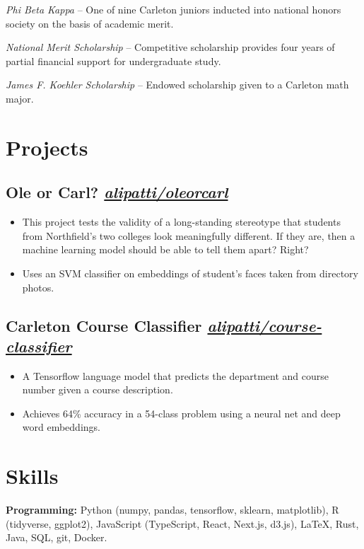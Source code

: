 \documentclass{ali-resume}
\begin{document}
\textit{Phi Beta Kappa} -- One of nine Carleton juniors inducted into national honors society on the basis of academic merit.

\textit{National Merit Scholarship} -- Competitive scholarship provides four years of partial financial support for undergraduate study.

\textit{James F. Koehler Scholarship} -- Endowed scholarship given to a Carleton math major.

\section{Projects}

\newcommand{\project}[2]{%
	\subsection{#1
		\hfill
		\normalfont \small \faicon{github}
		\href{http://github.com/alipatti/#2}{\textit{alipatti/#2}}
	}}

\project{Ole or Carl?}{oleorcarl}

\begin{itemize}
	\item This project tests the validity of a long-standing stereotype that students from Northfield's two colleges look meaningfully different. If they are, then a machine learning model should be able to tell them apart? Right?
	\item Uses an SVM classifier on embeddings of student's faces taken from directory photos.
\end{itemize}

\project{Carleton Course Classifier}{course-classifier}

\begin{itemize}
	\item A Tensorflow language model that predicts the department and course number given a course description.
	\item Achieves 64\% accuracy in a 54-class problem using a neural net and deep word embeddings.
\end{itemize}

\section{Skills}

\textbf{Programming:}
Python (numpy, pandas, tensorflow, sklearn, matplotlib), R (tidyverse, ggplot2), JavaScript (TypeScript, React, Next.js, d3.js), \LaTeX, Rust, Java, SQL, git, Docker.
\end{document}
